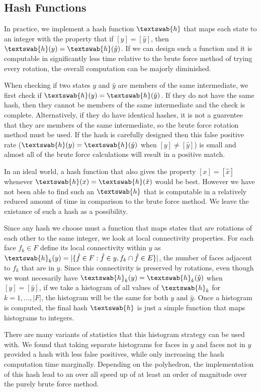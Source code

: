 \subsection{Hash Functions}
In practice, we implement a hash function $\textswab{h}$ that maps each state to an integer with the property that if $[y] = [\hat{y}]$, then $\textswab{h}(y) = \textswab{h}(\hat{y})$. If we can design such a function and it is computable in significantly less time relative to the brute force method of trying every rotation, the overall computation can be majorly diminished. 

When checking if two states $y$ and $\hat{y}$ are members of the same intermediate, we first check if $\textswab{h}(y) = \textswab{h}(\hat{y})$. If they do not have the same hash, then they cannot be members of the same intermediate and the check is complete. Alternatively, if they do have identical hashes, it is not a guarentee that they are members of the same intermediate, so the brute force rotation method must be used. If the hash is carefully designed then this false positive rate ($\textswab{h}(y) = \textswab{h}(\hat{y})$ when $[y] \neq [\hat{y}]$) is small and almost all of the brute force calculations will result in a positive match. 

In an ideal world, a hash function that also gives the property $[x] = [\hat{x}]$ whenever $\textswab{h}(x) = \textswab{h}(\hat{x})$ would be best. However we have not been able to find such an $\textswab{h}$ that is computable in a relatively reduced amount of time in comparison to the brute force method. We leave the existance of such a hash as a possibility. 

Since any hash we choose must a function that maps states that are rotations of each other to the same integer, we look at local connectivity properties. For each face $f_k \in F$ define its local connectivity within $y$ as  $\textswab{h}_k(y) = |\{\hat{f} \in F : \hat{f} \in y, f_k \cap \hat{f} \in E\}|$, the number of faces adjacent to $f_k$ that are in $y$. Since this connectivity is preserved by rotations, even though we wont necesarily have $\textswab{h}_k(y) = \textswab{h}_k(\hat{y})$ when $[y] = [\hat{y}]$, if we take a histogram of all values of $\textswab{h}_k$ for $k = 1,\dots,|F|$, the histogram will be the same for both $y$ and $\hat{y}$. Once a histogram is computed, the final hash $\textswab{h}$ is just a simple function that maps histograms to integers.

There are many variants of statistics that this histogram strategy can be used with. We found that taking separate histograms for faces in $y$ and faces not in $y$ provided a hash with less false positives, while only increasing the hash computation time marginally. Depending on the polyhedron, the implementation of this hash lead to an over all speed up of at least an order of magnitude over the purely brute force method.  

